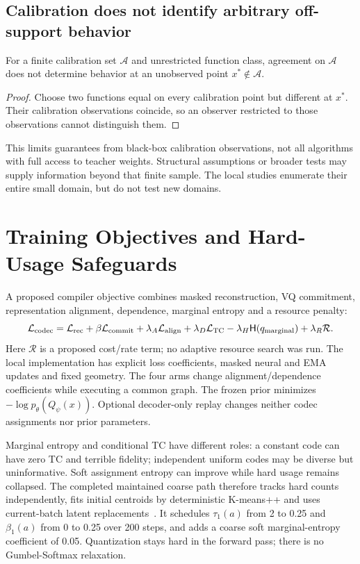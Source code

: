 \documentclass[11pt,a4paper]{article}
\begin{document}
\subsection{Calibration does not identify arbitrary off-support behavior}
\begin{lemma}
For a finite calibration set \(\mathcal A\) and unrestricted function class,
agreement on \(\mathcal A\) does not determine behavior at an unobserved point
\(x^*\notin\mathcal A\).
\end{lemma}
\begin{proof}
Choose two functions equal on every calibration point but different at \(x^*\).
Their calibration observations coincide, so an observer restricted to those
observations cannot distinguish them.
\end{proof}
This limits guarantees from black-box calibration observations, not all
algorithms with full access to teacher weights. Structural assumptions or
broader tests may supply information beyond that finite sample. The local
studies enumerate their entire small domain, but do not test new domains.

\section{Training Objectives and Hard-Usage Safeguards}
A proposed compiler objective combines masked reconstruction, VQ commitment,
representation alignment, dependence, marginal entropy and a resource penalty:
\begin{equation}
 \mathcal L_{\rm codec}=\mathcal L_{\rm rec}
 +\beta\mathcal L_{\rm commit}+\lambda_A\mathcal L_{\rm align}
 +\lambda_D\mathcal L_{\rm TC}-\lambda_H\mathsf H(q_{\rm marginal})
 +\lambda_R\mathcal R.
\end{equation}
Here \(\mathcal R\) is a proposed cost/rate term; no adaptive resource search was
run. The local implementation has explicit loss coefficients, masked neural
and EMA updates and fixed geometry. The four arms change alignment/dependence
coefficients while executing a common graph. The frozen prior minimizes
\(-\log p_\theta(Q_\psi(x))\). Optional decoder-only replay changes neither
codec assignments nor prior parameters.

Marginal entropy and conditional TC have different roles: a constant code can
have zero TC and terrible fidelity; independent uniform codes may be diverse
but uninformative. Soft assignment entropy can improve while hard usage remains
collapsed. The completed maintained coarse path therefore tracks hard counts
independently, fits initial centroids by deterministic K-means++ and uses
current-batch latent replacements~\citep{arthur2007kmeans}. It schedules
\(\tau_1(a)\) from 2 to 0.25 and \(\beta_1(a)\) from 0 to 0.25 over 200 steps,
and adds a coarse soft marginal-entropy coefficient of 0.05. Quantization stays
hard in the forward pass; there is no Gumbel-Softmax relaxation.
\end{document}

